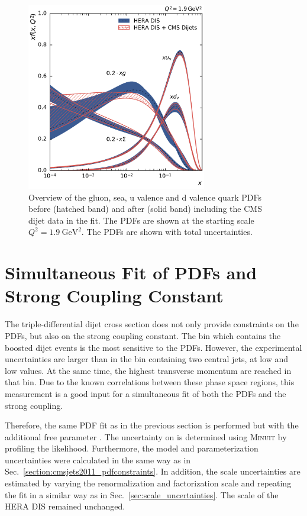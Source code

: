 \begin{figure}[tbp]
  \centering
  \includegraphics[width=0.7\textwidth]{figures/pdf_constraints/pdfcomp_direct_overview_1.9.pdf}\hfill%
  \caption[Overview of gluon and quark PDFs]{Overview of the gluon, sea, u
  valence and d valence quark PDFs before (hatched band) and after (solid band)
  including the CMS dijet data in the fit. The PDFs are shown at the starting
  scale $Q^2 = \SI{1.9}{\GeV \squared}$. The PDFs are shown with total
  uncertainties.}
  \label{fig:pdfconstraints:overview:19}
\end{figure}

\section{Simultaneous Fit of PDFs and Strong Coupling Constant}

The triple-differential dijet cross section does not only provide constraints on
the PDFs, but also on the strong coupling constant. The bin which contains the
boosted dijet events is the most sensitive to the PDFs. However, the
experimental uncertainties are larger than in the bin containing two central
jets, \ie at low \yboost and low \ystar values. At the same time, the highest
transverse momentum are reached in that bin. Due to the known correlations
between these phase space regions, this measurement is a good input for a
simultaneous fit of both the PDFs and the strong coupling. 

Therefore, the same PDF fit as in the previous section is performed but with the
additional free parameter \as. The uncertainty on \as is determined using
\textsc{Minuit} by profiling the likelihood. Furthermore, the model and
parameterization uncertainties were calculated in the same way as in
Sec.~\ref{section:cmsjets2011_pdfconstraints}. In addition, the scale
uncertainties are estimated by varying the renormalization and factorization
scale and repeating the fit in a similar way as in
Sec.~\ref{sec:scale_uncertainties}. The scale of the HERA DIS remained
unchanged. 

